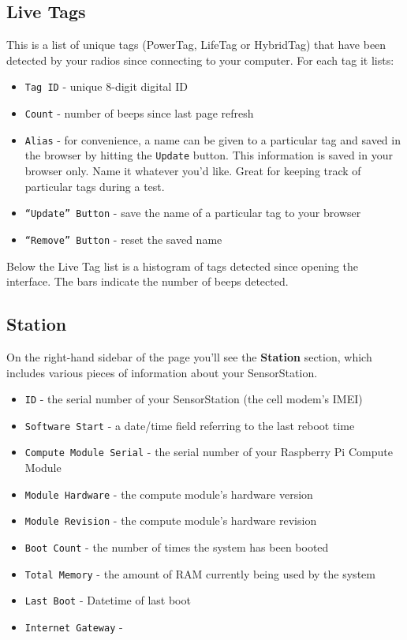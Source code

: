 \documentclass[
]{article}
\providecommand{\tightlist}{%
  \setlength{\itemsep}{0pt}\setlength{\parskip}{0pt}}
\begin{document}
\hypertarget{live-tags}{%
\subsection{Live Tags}\label{live-tags}}

This is a list of unique tags (PowerTag, LifeTag or HybridTag) that have
been detected by your radios since connecting to your computer. For each
tag it lists:

\begin{itemize}
\tightlist
\item
  \texttt{Tag\ ID} - unique 8-digit digital ID
\item
  \texttt{Count} - number of beeps since last page refresh
\item
  \texttt{Alias} - for convenience, a name can be given to a particular
  tag and saved in the browser by hitting the \texttt{Update} button.
  This information is saved in your browser only. Name it whatever you'd
  like. Great for keeping track of particular tags during a test.
\item
  \texttt{“Update”\ Button} - save the name of a particular tag to your
  browser
\item
  \texttt{“Remove”\ Button} - reset the saved name
\end{itemize}

Below the Live Tag list is a histogram of tags detected since opening
the interface. The bars indicate the number of beeps detected.

\hypertarget{station}{%
\subsection{Station}\label{station}}

On the right-hand sidebar of the page you'll see the \textbf{Station}
section, which includes various pieces of information about your
SensorStation.

\begin{itemize}
\tightlist
\item
  \texttt{ID} - the serial number of your SensorStation (the cell
  modem's IMEI)
\item
  \texttt{Software\ Start} - a date/time field referring to the last
  reboot time
\item
  \texttt{Compute\ Module\ Serial} - the serial number of your Raspberry
  Pi Compute Module
\item
  \texttt{Module\ Hardware} - the compute module's hardware version
\item
  \texttt{Module\ Revision} - the compute module's hardware revision
\item
  \texttt{Boot\ Count} - the number of times the system has been booted
\item
  \texttt{Total\ Memory} - the amount of RAM currently being used by the
  system
\item
  \texttt{Last\ Boot} - Datetime of last boot
\item
  \texttt{Internet\ Gateway} -
\end{itemize}
\end{document}
